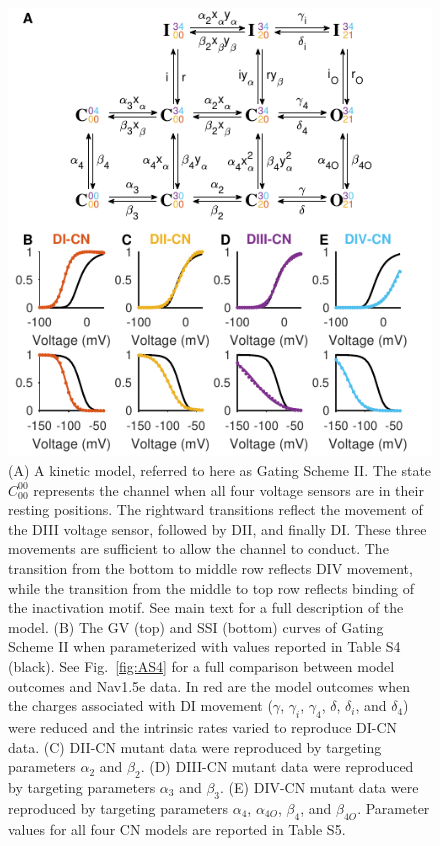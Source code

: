 \begin{figure}[t]
\begin{minipage}[c]{85mm}
    \centering
    \includegraphics[width=\textwidth]{Figures/AppendixA/figure10.pdf}
\end{minipage}\hfill
\begin{minipage}[c]{70mm}
    \caption{
    (A) A kinetic model, referred to here as Gating Scheme II. The state $C_{00}^{00}$ represents the channel when all four voltage sensors are in their resting positions. The rightward transitions reflect the movement of the DIII voltage sensor, followed by DII, and finally DI. These three movements are sufficient to allow the channel to conduct. The transition from the bottom to middle row reflects DIV movement, while the transition from the middle to top row reflects binding of the inactivation motif. See main text for a full description of the model.
    (B) The GV (top) and SSI (bottom) curves of Gating Scheme II when parameterized with values reported in Table S4 (black). See Fig.~\ref{fig:AS4} for a full comparison between model outcomes and Nav1.5e data. In red are the model outcomes when the charges associated with DI movement ($\gamma$, $\gamma_i$, $\gamma_4$, $\delta$, $\delta_i$, and $\delta_4$) were reduced and the intrinsic rates varied to reproduce DI-CN data. 
    (C) DII-CN mutant data were reproduced by targeting parameters $\alpha_2$ and $\beta_2$. 
    (D) DIII-CN mutant data were reproduced by targeting parameters $\alpha_3$ and $\beta_3$. 
    (E) DIV-CN mutant data were reproduced by targeting parameters $\alpha_4$, $\alpha_{4O}$, $\beta_4$, and $\beta_{4O}$. 
    Parameter values for all four CN models are reported in Table S5.
}
\label{fig:A10}
\end{minipage}
\end{figure}

